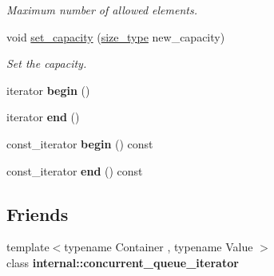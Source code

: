 \begin{DoxyCompactItemize}
\begin{DoxyCompactList}\small\item\em Maximum number of allowed elements. \end{DoxyCompactList}\item 
void \hyperlink{classtbb_1_1concurrent__queue_a5d23b68f71c633a79eb08610bb038922}{set\+\_\+capacity} (\hyperlink{classtbb_1_1concurrent__queue_aa697402bd9583bd4f26dfd3a912a39d1}{size\+\_\+type} new\+\_\+capacity)
\begin{DoxyCompactList}\small\item\em Set the capacity. \end{DoxyCompactList}\item 
\hypertarget{classtbb_1_1concurrent__queue_af2e65e0aece2be3517cb3d4ba9244530}{}iterator {\bfseries begin} ()\label{classtbb_1_1concurrent__queue_af2e65e0aece2be3517cb3d4ba9244530}

\item 
\hypertarget{classtbb_1_1concurrent__queue_a78e1d782a1b817c91c130e07493003b8}{}iterator {\bfseries end} ()\label{classtbb_1_1concurrent__queue_a78e1d782a1b817c91c130e07493003b8}

\item 
\hypertarget{classtbb_1_1concurrent__queue_a7f1bb859d87c0193bf6ac228fb06a8a9}{}const\+\_\+iterator {\bfseries begin} () const \label{classtbb_1_1concurrent__queue_a7f1bb859d87c0193bf6ac228fb06a8a9}

\item 
\hypertarget{classtbb_1_1concurrent__queue_aa704dbf9cea09dea8a51332c3e7e931c}{}const\+\_\+iterator {\bfseries end} () const \label{classtbb_1_1concurrent__queue_aa704dbf9cea09dea8a51332c3e7e931c}

\end{DoxyCompactItemize}
\subsection*{Friends}
\begin{DoxyCompactItemize}
\item 
\hypertarget{classtbb_1_1concurrent__queue_a1f5eec0de2e660ea5372d19393f0920b}{}{\footnotesize template$<$typename Container , typename Value $>$ }\\class {\bfseries internal\+::concurrent\+\_\+queue\+\_\+iterator}\label{classtbb_1_1concurrent__queue_a1f5eec0de2e660ea5372d19393f0920b}

\end{DoxyCompactItemize}


